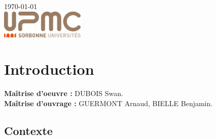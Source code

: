 \documentclass[a4paper,8pt]{report}
\begin{document}
\begin{titlepage}

{\large \today}\\[3cm] %


 

\vfill %
\includegraphics[width=4cm]{images/upmc.png}\\[1cm] %
\end{titlepage}

\renewcommand{\contentsname}{Sommaire}
\tableofcontents
\listoffigures

\chapter{Introduction}

\noindent \textbf{Ma\^itrise d'oeuvre :} DUBOIS Swan.\\
\noindent \textbf{Ma\^itrise d'ouvrage :} GUERMONT Arnaud, BIELLE Benjamin.\\

\section*{Contexte}\label{sec:name}
\end{document}
